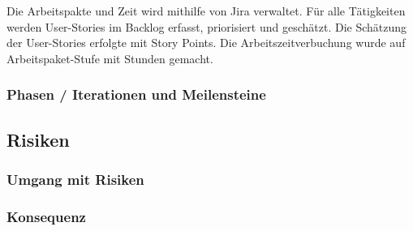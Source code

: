 Die Arbeitspakte und Zeit wird mithilfe von Jira verwaltet. Für alle Tätigkeiten werden User-Stories im Backlog erfasst, priorisiert und geschätzt. Die Schätzung der User-Stories erfolgte mit Story Points. Die Arbeitszeitverbuchung wurde auf Arbeitspaket-Stufe mit Stunden gemacht.

\subsubsection{Phasen / Iterationen und Meilensteine}
\label{Zeitplanung:Phasen / Iterationen und Meilensteine}



\subsection{Risiken}
\label{Projektmanagement:Risiken}



\subsubsection{Umgang mit Risiken}
\label{Risiken:Umang mit Risiken}


\subsubsection{Konsequenz}
\label{Risiken:Konsequenz}

